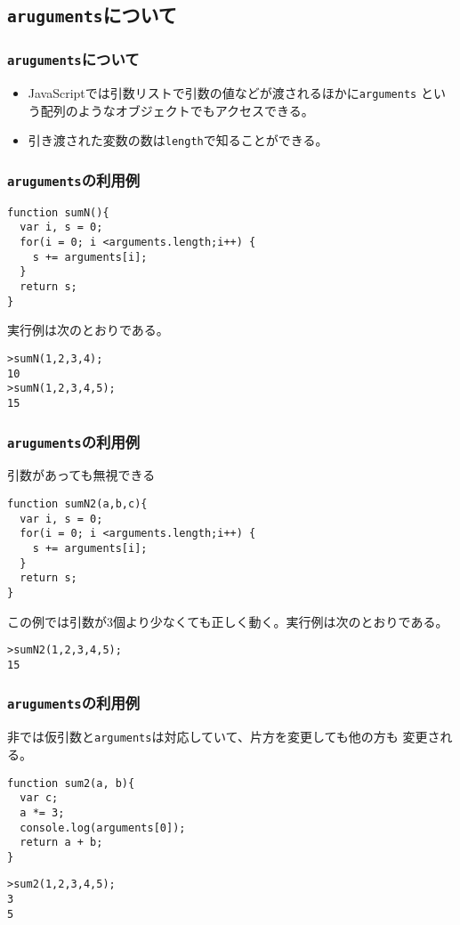 \subsection{\protect\texttt{aruguments}について}
\begin{frame}[containsverbatim]
\frametitle{\protect\texttt{aruguments}について}
\begin{itemize}
 \item JavaScriptでは引数リストで引数の値などが渡されるほかに\texttt{arguments}
という配列のようなオブジェクトでもアクセスできる。
 \item 引き渡された変数の数は\Verb+length+で知ることができる。
\end{itemize}
\end{frame}
\begin{frame}[containsverbatim]
\frametitle{\protect\texttt{aruguments}の利用例}
\begin{Verbatim}
function sumN(){
  var i, s = 0;
  for(i = 0; i <arguments.length;i++) {
    s += arguments[i];
  }
  return s;
}
\end{Verbatim}
実行例は次のとおりである。
\begin{Verbatim}
>sumN(1,2,3,4);
10
>sumN(1,2,3,4,5);
15
\end{Verbatim}
\end{frame}
\begin{frame}[containsverbatim]
\frametitle{\protect\texttt{aruguments}の利用例}
引数があっても無視できる
\begin{Verbatim}
function sumN2(a,b,c){
  var i, s = 0;
  for(i = 0; i <arguments.length;i++) {
    s += arguments[i];
  }
  return s;
}
\end{Verbatim}
この例では引数が3個より少なくても正しく動く。実行例は次のとおりである。
\begin{Verbatim}
>sumN2(1,2,3,4,5);
15
\end{Verbatim}
\end{frame}
\begin{frame}[containsverbatim]
\frametitle{\protect\texttt{aruguments}の利用例}
非\Strict では仮引数と\Verb+arguments+は対応していて、片方を変更しても他の方も
       変更される。
\begin{Verbatim}
function sum2(a, b){
  var c;
  a *= 3;
  console.log(arguments[0]);
  return a + b;
}
\end{Verbatim}
\begin{Verbatim}
>sum2(1,2,3,4,5);
3 
5
\end{Verbatim}
\end{frame}
